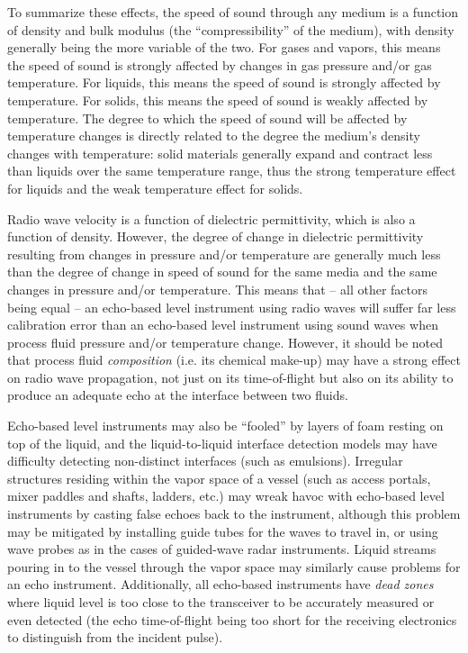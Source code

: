 \vskip 10pt

To summarize these effects, the speed of sound through any medium is a function of density and bulk modulus (the ``compressibility'' of the medium), with density generally being the more variable of the two.  For gases and vapors, this means the speed of sound is strongly affected by changes in gas pressure and/or gas temperature.  For liquids, this means the speed of sound is strongly affected by temperature.  For solids, this means the speed of sound is weakly affected by temperature.  The degree to which the speed of sound will be affected by temperature changes is directly related to the degree the medium's density changes with temperature: solid materials generally expand and contract less than liquids over the same temperature range, thus the strong temperature effect for liquids and the weak temperature effect for solids.    

Radio wave velocity is a function of dielectric permittivity, which is also a function of density.  However, the degree of change in dielectric permittivity resulting from changes in pressure and/or temperature are generally much less than the degree of change in speed of sound for the same media and the same changes in pressure and/or temperature.  This means that -- all other factors being equal -- an echo-based level instrument using radio waves will suffer far less calibration error than an echo-based level instrument using sound waves when process fluid pressure and/or temperature change.  However, it should be noted that process fluid \textit{composition} (i.e. its chemical make-up) may have a strong effect on radio wave propagation, not just on its time-of-flight but also on its ability to produce an adequate echo at the interface between two fluids.

\vskip 10pt

Echo-based level instruments may also be ``fooled'' by layers of foam resting on top of the liquid, and the liquid-to-liquid interface detection models may have difficulty detecting non-distinct interfaces (such as emulsions).  Irregular structures residing within the vapor space of a vessel (such as access portals, mixer paddles and shafts, ladders, etc.) may wreak havoc with echo-based level instruments by casting false echoes back to the instrument, although this problem may be mitigated by installing guide tubes for the waves to travel in, or using wave probes as in the cases of guided-wave radar instruments.  Liquid streams pouring in to the vessel through the vapor space may similarly cause problems for an echo instrument.  Additionally, all echo-based instruments have \textit{dead zones} where liquid level is too close to the transceiver to be accurately measured or even detected (the echo time-of-flight being too short for the receiving electronics to distinguish from the incident pulse).

